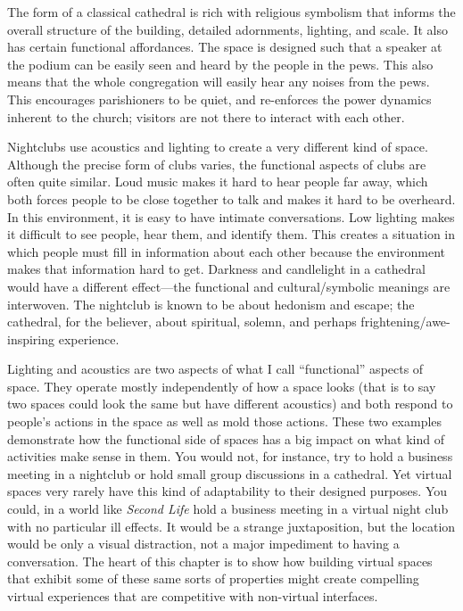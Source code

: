 The form of a classical cathedral is rich with religious symbolism that informs the overall structure of the building, detailed adornments, lighting, and scale. It also has certain functional affordances. The space is designed such that a speaker at the podium can be easily seen and heard by the people in the pews. This also means that the whole congregation will easily hear any noises from the pews. This encourages parishioners to be quiet, and re-enforces the power dynamics inherent to the church; visitors are not there to interact with each other.

Nightclubs use acoustics and lighting to create a very different kind of space. Although the precise form of clubs varies, the functional aspects of clubs are often quite similar. Loud music makes it hard to hear people far away, which both forces people to be close together to talk and makes it hard to be overheard. In this environment, it is easy to have intimate conversations. Low lighting makes it difficult to see people, hear them, and identify them. This creates a situation in which people must fill in information about each other because the environment makes that information hard to get. Darkness and candlelight in a cathedral would have a different effect---the functional and cultural/symbolic meanings are interwoven.  The nightclub is known to be about hedonism and escape; the cathedral, for the believer, about spiritual, solemn, and perhaps frightening/awe-inspiring experience.

Lighting and acoustics are two aspects of what I call ``functional'' aspects of space. They operate mostly independently of how a space looks (that is to say two spaces could look the same but have different acoustics) and both respond to people’s actions in the space as well as mold those actions. These two examples demonstrate how the functional side of spaces has a big impact on what kind of activities make sense in them. You would not, for instance, try to hold a business meeting in a nightclub or hold small group discussions in a cathedral. Yet virtual spaces very rarely have this kind of adaptability to their designed purposes. You could, in a world like \emph{Second Life}  hold a business meeting in a virtual night club with no particular ill effects. It would be a strange juxtaposition, but the location would be only a visual distraction, not a major impediment to having a conversation. The heart of this chapter is to show how building virtual spaces that exhibit some of these same sorts of properties might create compelling virtual experiences that are competitive with non-virtual interfaces.

